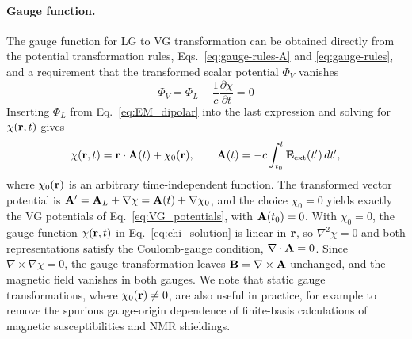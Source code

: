 \paragraph{Gauge function.}
The gauge function for LG to VG transformation can be obtained directly from the potential transformation rules,
Eqs.~\eqref{eq:gauge-rules-A} and \eqref{eq:gauge-rules}, and a requirement that the transformed scalar potential $\Phi_V$  vanishes
\begin{equation}
  \Phi_V = \Phi_L - \frac{1}{c}\frac{\partial\chi}{\partial t} = 0
  \label{eq:chi_condition}
\end{equation}
Inserting $\Phi_L$  from  Eq.~\eqref{eq:EM_dipolar} into the last expression and solving  for  
$\chi(\vb r,t)$  gives 
\begin{equation}
  \chi(\vb{r},t) = \vb{r}\cdot\vb{A}(t) + \chi_0(\vb{r}),
  \qquad
	\vb{A}(t) = -c\int_{t_0}^{t}\vb{E}_\mathrm{ext}(t')\,dt',
  \label{eq:chi_solution}
\end{equation}
%
where $\chi_0(\vb{r})$ is an arbitrary time-independent function. The
transformed vector potential is
$\vb{A}' = \vb{A}_L + \nabla\chi = \vb{A}(t) + \nabla\chi_0$, and the
choice $\chi_0 = 0$ yields exactly the VG potentials of
Eq.~\eqref{eq:VG_potentials}, with $\vb{A}(t_0)=0$. 
With $\chi_0 = 0$, the gauge function  $\chi(\vb r,t)$ in Eq.~\eqref{eq:chi_solution} is  linear in $\vb r$, so $\nabla^2\chi = 0$ and both
representations satisfy the Coulomb-gauge condition, $\nabla\cdot\vb A = 0$.
Since $\nabla\times\nabla\chi = 0$, the gauge transformation leaves
$\vb B = \nabla\times\vb A$ unchanged, and the magnetic field vanishes in both
gauges.
We note that static gauge transformations, where $\chi_0(\vb r)\neq 0$,  are also useful in practice, for
example to remove the spurious gauge-origin dependence of finite-basis
calculations of magnetic susceptibilities and NMR
shieldings.\cite{Ditchfield-1974,Keith-Bader-1993,pickard-mauri-2001}

